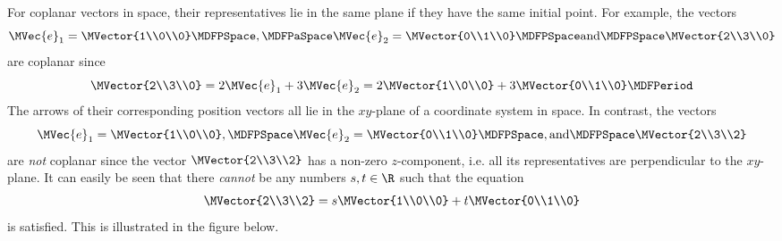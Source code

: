 \begin{MIntro}
\begin{center}
{
} 
\end{center}
For coplanar vectors in space, their representatives lie in the same 
plane if they have the same initial point. For example, the vectors
\[
 \MVec{e}_1=\MVector{1\\0\\0}\MDFPSpace,\MDFPaSpace\MVec{e}_2=\MVector{0\\1\\0}\MDFPSpace\textrm{and}\MDFPSpace\MVector{2\\3\\0}
\]
are coplanar since 
\[
 \MVector{2\\3\\0}=2\MVec{e}_1 + 3\MVec{e}_2=2\MVector{1\\0\\0}+3\MVector{0\\1\\0}\MDFPeriod
\]
The arrows of their corresponding position vectors all lie in the $x y$-plane of a coordinate system in space. 
In contrast, the vectors 
\[
 \MVec{e}_1=\MVector{1\\0\\0},\MDFPSpace\MVec{e}_2=\MVector{0\\1\\0}\MDFPSpace, \textrm{and}\MDFPSpace\MVector{2\\3\\2}
\]
are \textit{not} coplanar since the vector $\MVector{2\\3\\2}$ has a non-zero $z$-component, i.e. all its representatives 
are perpendicular to the $x y$-plane. It can easily be seen that there \textit{cannot} be any numbers $s,t\in\R$ 
such that the equation 
\[
 \MVector{2\\3\\2}=s\MVector{1\\0\\0}+t\MVector{0\\1\\0}
\]
is satisfied. This is illustrated in the figure below.
\begin{center}
\end{center}
\end{MIntro}
